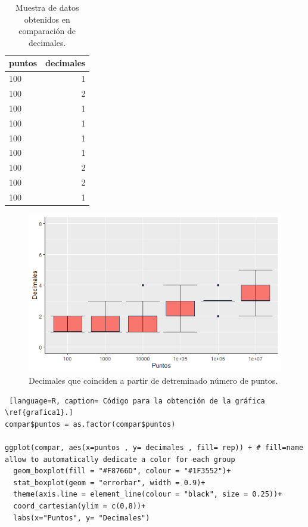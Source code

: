 \documentclass{article}
\begin{document}
\begin{table}[h!]
\centering
\caption{Muestra de datos obtenidos en comparación de decimales.}
\label{tabla1}
\begin{tabular}{|l|r|}
\hline
puntos & \multicolumn{1}{l|}{decimales} \\ \hline
100 & 1 \\ \hline
100 & 2 \\ \hline
100 & 1 \\ \hline
100 & 1 \\ \hline
100 & 1 \\ \hline
100 & 1 \\ \hline
100 & 2 \\ \hline
100 & 2 \\ \hline
100 & 1 \\ \hline
\end{tabular}
\end{table}

\begin{figure} [h!]%
\renewcommand{\figurename}{Gráfica}
    \centering
    \caption{Decimales que coinciden a partir de detreminado número de puntos.}
    \label{grafica1}
    \includegraphics[width=120mm]{grafica1.png} %
\end{figure}

\begin{lstlisting} [language=R, caption= Código para la obtención de la gráfica \ref{grafica1}.]
compar$puntos = as.factor(compar$puntos)

ggplot(compar, aes(x=puntos , y= decimales , fill= rep)) + # fill=name allow to automatically dedicate a color for each group
  geom_boxplot(fill = "#F8766D", colour = "#1F3552")+
  stat_boxplot(geom = "errorbar", width = 0.9)+
  theme(axis.line = element_line(colour = "black", size = 0.25))+
  coord_cartesian(ylim = c(0,8))+
  labs(x="Puntos", y= "Decimales")
\end{lstlisting}
\end{document}
